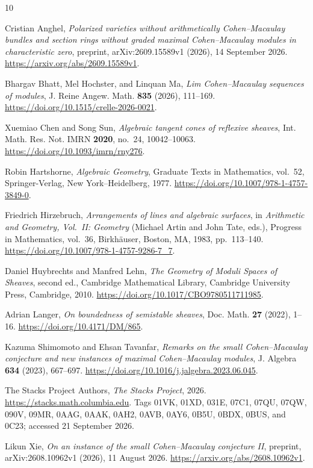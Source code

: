 \documentclass[11pt,reqno]{amsart}
\numberwithin{equation}{section}
\theoremstyle{definition}
\theoremstyle{remark}
\begin{document}
\enlargethispage{2\baselineskip}
\begin{thebibliography}{10}

Cristian Anghel,
\emph{Polarized varieties without arithmetically Cohen--Macaulay bundles
and section rings without graded maximal Cohen--Macaulay modules in
characteristic zero},
preprint, arXiv:2609.15589v1 (2026), 14 September 2026.
\url{https://arxiv.org/abs/2609.15589v1}.

Bhargav Bhatt, Mel Hochster, and Linquan Ma,
\emph{Lim Cohen--Macaulay sequences of modules},
J. Reine Angew. Math. \textbf{835} (2026), 111--169.
\url{https://doi.org/10.1515/crelle-2026-0021}.

Xuemiao Chen and Song Sun,
\emph{Algebraic tangent cones of reflexive sheaves},
Int. Math. Res. Not. IMRN \textbf{2020}, no.~24, 10042--10063.
\url{https://doi.org/10.1093/imrn/rny276}.

Robin Hartshorne,
\emph{Algebraic Geometry},
Graduate Texts in Mathematics, vol.~52,
Springer-Verlag, New York--Heidelberg, 1977.
\url{https://doi.org/10.1007/978-1-4757-3849-0}.

Friedrich Hirzebruch,
\emph{Arrangements of lines and algebraic surfaces},
in \emph{Arithmetic and Geometry, Vol.~II: Geometry}
(Michael Artin and John Tate, eds.),
Progress in Mathematics, vol.~36,
Birkh\"auser, Boston, MA, 1983, pp.~113--140.
\url{https://doi.org/10.1007/978-1-4757-9286-7_7}.

Daniel Huybrechts and Manfred Lehn,
\emph{The Geometry of Moduli Spaces of Sheaves},
second ed., Cambridge Mathematical Library,
Cambridge University Press, Cambridge, 2010.
\url{https://doi.org/10.1017/CBO9780511711985}.

Adrian Langer,
\emph{On boundedness of semistable sheaves},
Doc. Math. \textbf{27} (2022), 1--16.
\url{https://doi.org/10.4171/DM/865}.

Kazuma Shimomoto and Ehsan Tavanfar,
\emph{Remarks on the small Cohen--Macaulay conjecture and new instances
of maximal Cohen--Macaulay modules},
J. Algebra \textbf{634} (2023), 667--697.
\url{https://doi.org/10.1016/j.jalgebra.2023.06.045}.

The Stacks Project Authors,
\emph{The Stacks Project}, 2026.
\url{https://stacks.math.columbia.edu}.
Tags 01VK, 01XD, 031E, 07C1, 07QU, 07QW, 090V, 09MR, 0AAG, 0AAK,
0AH2, 0AVB, 0AY6, 0B5U, 0BDX, 0BUS, and 0C23;
accessed 21 September 2026.

Likun Xie,
\emph{On an instance of the small Cohen--Macaulay conjecture II},
preprint, arXiv:2608.10962v1 (2026), 11 August 2026.
\url{https://arxiv.org/abs/2608.10962v1}.

\end{thebibliography}
\end{document}
